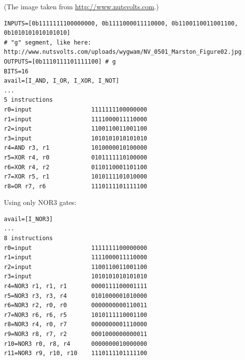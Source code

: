 (The image taken from \url{http://www.nutsvolts.com}.)

\begin{lstlisting}
INPUTS=[0b1111111100000000, 0b1111000011110000, 0b1100110011001100, 0b1010101010101010]
# "g" segment, like here: http://www.nutsvolts.com/uploads/wygwam/NV_0501_Marston_Figure02.jpg
OUTPUTS=[0b1110111101111100] # g
BITS=16
avail=[I_AND, I_OR, I_XOR, I_NOT]
...
5 instructions
r0=input                 1111111100000000
r1=input                 1111000011110000
r2=input                 1100110011001100
r3=input                 1010101010101010
r4=AND r3, r1            1010000010100000
r5=XOR r4, r0            0101111110100000
r6=XOR r4, r2            0110110001101100
r7=XOR r5, r1            1010111101010000
r8=OR r7, r6             1110111101111100
\end{lstlisting}

Using only NOR3 gates:

\begin{lstlisting}
avail=[I_NOR3]
...
8 instructions
r0=input                 1111111100000000
r1=input                 1111000011110000
r2=input                 1100110011001100
r3=input                 1010101010101010
r4=NOR3 r1, r1, r1       0000111100001111
r5=NOR3 r3, r3, r4       0101000001010000
r6=NOR3 r2, r0, r0       0000000000110011
r7=NOR3 r6, r6, r5       1010111110001100
r8=NOR3 r4, r0, r7       0000000001110000
r9=NOR3 r8, r7, r2       0001000000000011
r10=NOR3 r0, r8, r4      0000000010000000
r11=NOR3 r9, r10, r10    1110111101111100
\end{lstlisting}

